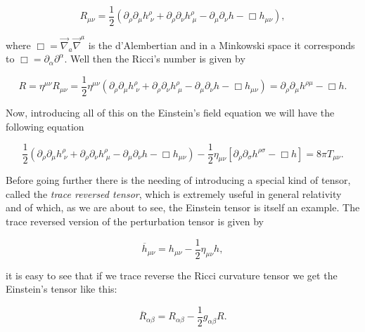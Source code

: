         \begin{equation}
            R_{\mu\nu} = \frac{1}{2}\left(\partial_{\rho}\partial_{\mu}h^{\rho}_{\;\nu} + \partial_{\rho}\partial_{\nu}h^{\rho}_{\;\mu} - \partial_{\mu}\partial_{\nu}h - \Box h_{\mu\nu} \right),
        \end{equation}

        where $\Box = \Vec{\nabla}_a\Vec{\nabla}^a$ is the d'Alembertian and in a Minkowski space it corresponds to $\Box = \partial_{\alpha}\partial^{\alpha}$. Well then the Ricci's number is given by

        \begin{equation}
            R = \eta^{\mu\nu}R_{\mu\nu} = \frac{1}{2}\eta^{\mu\nu}\left(\partial_{\rho}\partial_{\mu}h^{\rho}_{\;\nu} + \partial_{\rho}\partial_{\nu}h^{\rho}_{\;\mu} - \partial_{\mu}\partial_{\nu}h - \Box h_{\mu\nu} \right) = \partial_{\rho}\partial_{\mu}h^{\rho\mu}-\Box h.
        \end{equation}

        Now, introducing all of this on the Einstein's field equation we will have the following equation

        \begin{equation}
            \frac{1}{2}\left(\partial_{\rho}\partial_{\mu}h^{\rho}_{\;\nu} + \partial_{\rho}\partial_{\nu}h^{\rho}_{\;\mu} - \partial_{\mu}\partial_{\nu}h - \Box h_{\mu\nu} \right) - \frac{1}{2}\eta_{\mu\nu}\left[\partial_{\rho}\partial_{\sigma}h^{\rho\sigma} - \Box h \right] = 8\pi T_{\mu\nu}.
        \end{equation}

        Before going further there is the needing of introducing a special kind of tensor, called the \textit{trace reversed tensor}, which is extremely useful in general relativity and of which, as we are about to see, the Einstein tensor is itself an example. The trace reversed version of the perturbation tensor is given by

        \begin{equation}
            \overline{h}_{\mu\nu} = h_{\mu\nu} - \frac{1}{2}\eta_{\mu\nu}h,
        \end{equation}

        it is easy to see that if we trace reverse the Ricci curvature tensor we get the Einstein's tensor like this:

        \begin{equation}
            \overline{R}_{\alpha\beta}=R_{\alpha\beta}-\frac{1}{2}g_{\alpha\beta}R.
        \end{equation}


